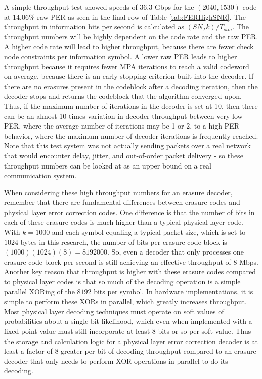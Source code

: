 \documentclass[conference]{IEEEtran}
\begin{document}
A simple throughput test showed speeds of 36.3 Gbps for the $(2040, 1530)$ code at 14.06\% raw PER as seen in the final row of Table \ref{tab:FERHighSNR}. The throughput in information bits per second is calculated as $({S N_T k})/{T_{sim}}$. The throughput numbers will be highly dependent on the code rate and the raw PER.  A higher code rate will lead to higher throughput, because there are fewer check node constraints per information symbol.  A lower raw PER leads to higher throughput because it requires fewer MPA iterations to reach a valid codeword on average, because there is an early stopping criterion built into the decoder.  If there are no erasures present in the codeblock after a decoding iteration, then the decoder stops and returns the codeblock that the algorithm converged upon.  Thus, if the maximum number of iterations in the decoder is set at 10, then there can be an almost 10 times variation in decoder throughput between very low PER, where the average number of iterations may be 1 or 2, to a high PER behavior, where the maximum number of decoder iterations is frequently reached.  Note that this test system was not actually sending packets over a real network that would encounter delay, jitter, and out-of-order packet delivery - so these throughput numbers can be looked at as an upper bound on a real communication system.  

When considering these high throughput numbers for an erasure decoder, remember that there are fundamental differences between erasure codes and physical layer error correction codes.  One difference is that the number of bits in each of these erasure codes is much higher than a typical physical layer code.  With $k=1000$ and each symbol equaling a typical packet size, which is set to $1024$ bytes in this research, the number of bits per erasure code block is $(1000)(1024)(8) = 8192000$.  So, even a decoder that only processes one erasure code block per second is still achieving an effective throughput of 8 Mbps. Another key reason that throughput is higher with these erasure codes compared to physical layer codes is that so much of the decoding operation is a simple parallel XORing of the $8192$ bits per symbol.  In hardware implementations, it is simple to perform these XORs in parallel, which greatly increases throughput.  Most physical layer decoding techniques must operate on soft values of probabilities about a single bit likelihood, which even when implemented with a fixed point value must still incorporate at least 8 bits or so per soft value.  Thus the storage and calculation logic for a physical layer error correction decoder is at least a factor of 8 greater per bit of decoding throughput compared to an erasure decoder that only needs to perform XOR operations in parallel to do its decoding.
\end{document}
